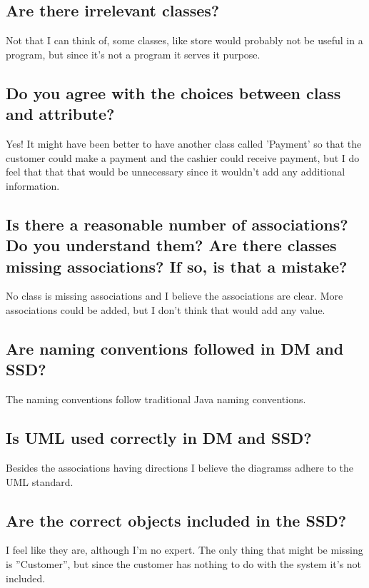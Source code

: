\documentclass[a4paper]{scrreprt}
\begin{document}
        \subsection{Are there irrelevant classes?}
            Not that I can think of, some classes, like store would probably not
            be useful in a program, but since it's not a program it serves it
            purpose.

        \subsection{Do you agree with the choices between class and attribute?}
            Yes! It might have been better to have another class called 'Payment'
            so that the customer could make a payment and the cashier could
            receive payment, but I do feel that that that would be unnecessary 
            since it wouldn't add any additional information.

        \subsection{Is there a reasonable number of associations? Do you understand them? Are there classes missing associations? If so, is that a mistake?}
            No class is missing associations and I believe the associations are
            clear. More associations could be added, but I don't think that 
            would add any value.

        \subsection{Are naming conventions followed in DM and SSD?}
            The naming conventions follow traditional Java naming conventions.

        \subsection{Is UML used correctly in DM and SSD?}
            Besides the associations having directions I believe the diagramss
            adhere to the UML standard.

        \subsection{Are the correct objects included in the SSD?}
            I feel like they are, although I'm no expert. The only thing that
            might be missing is ''Customer'', but since the customer has nothing
            to do with the system it's not included.
\end{document}
